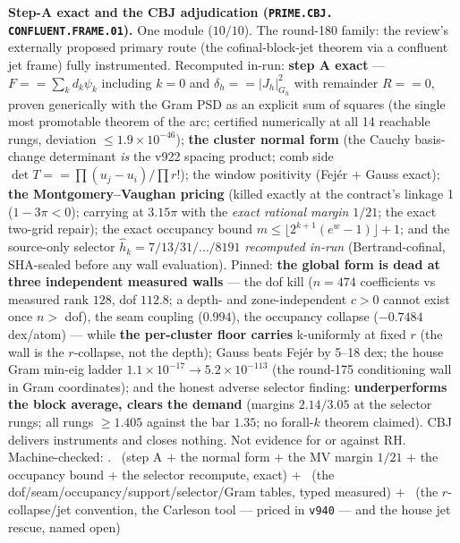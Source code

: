 \par\smallskip\noindent\textbf{Step-A exact and the CBJ
adjudication (\texttt{PRIME.\allowbreak CBJ.\allowbreak
CONFLUENT.\allowbreak FRAME.01}).}
One module ($10/10$).  The round-180 family: the review's
externally proposed primary route (the cofinal-block-jet theorem
via a confluent jet frame) fully instrumented.  Recomputed in-run:
\textbf{step A exact} --- $F == \sum_k d_k\psi_k$ including $k = 0$
and $\delta_h == |J_h|^2_{G_h}$ with remainder $R == 0$, proven
generically with the Gram PSD as an explicit sum of squares (the
single most promotable theorem of the arc; certified numerically
at all 14 reachable rungs, deviation $\le 1.9\times10^{-46}$);
\textbf{the cluster normal form} (the Cauchy basis-change
determinant \emph{is} the v922 spacing product; comb side $\det T
== \prod(u_j - u_i)/\prod r!$); the window positivity (Fej\'er $+$
Gauss exact); \textbf{the Montgomery--Vaughan pricing} (killed
exactly at the contract's linkage 1 ($1 - 3\pi < 0$); carrying at
$3.15\pi$ with the \emph{exact rational margin} $1/21$; the exact
two-grid repair); the exact occupancy bound $m \le \lfloor
2^{k+1}(e^w - 1)\rfloor + 1$; and the source-only selector
$\hat h_k = 7/13/31/\ldots/8191$ \emph{recomputed in-run}
(Bertrand-cofinal, SHA-sealed before any wall evaluation).
Pinned: \textbf{the global form is dead at three independent
measured walls} --- the dof kill ($n = 474$ coefficients vs
measured rank $128$, dof $112.8$; a depth- and zone-independent
$c > 0$ cannot exist once $n >$ dof), the seam coupling ($0.994$),
the occupancy collapse ($-0.7484$ dex/atom) --- while \textbf{the
per-cluster floor carries} k-uniformly at fixed $r$ (the wall is
the $r$-collapse, not the depth); Gauss beats Fej\'er by 5--18
dex; the house Gram min-eig ladder $1.1\times10^{-17} \to
5.2\times10^{-113}$ (the round-175 conditioning wall in Gram
coordinates); and the honest adverse selector finding:
\textbf{underperforms the block average, clears the demand}
(margins $2.14/3.05$ at the selector rungs; all rungs $\ge 1.405$
against the bar $1.35$; no forall-$k$ theorem claimed).  CBJ
delivers instruments and closes nothing.  Not evidence for or
against RH.
Machine-checked: .
\mE\ (step A $+$ the normal form $+$ the MV margin $1/21$ $+$ the
occupancy bound $+$ the selector recompute, exact) $+$ \mC\ (the
dof/seam/occupancy/support/selector/Gram tables, typed measured)
$+$ \mO\ (the $r$-collapse/jet convention, the Carleson tool ---
priced in \texttt{v940} --- and the house jet rescue, named open)
\par\smallskip


